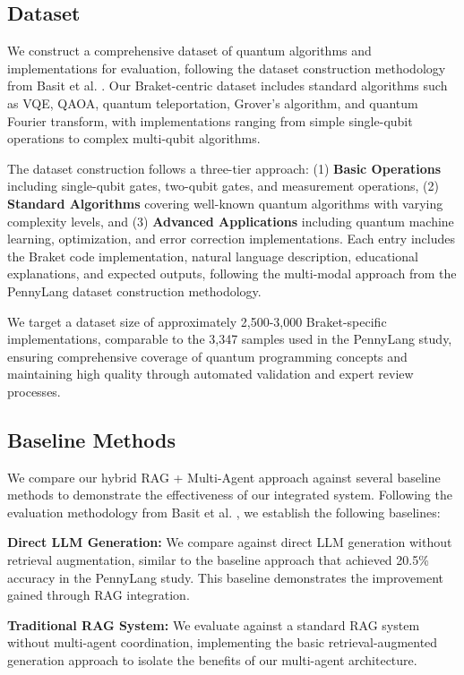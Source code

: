 \documentclass[runningheads]{llncs}
\begin{document}
\subsection{Dataset}
We construct a comprehensive dataset of quantum algorithms and implementations for evaluation, following the dataset construction methodology from Basit et al. \cite{basit2025pennylangpioneeringllmbasedquantum}. Our Braket-centric dataset includes standard algorithms such as VQE, QAOA, quantum teleportation, Grover's algorithm, and quantum Fourier transform, with implementations ranging from simple single-qubit operations to complex multi-qubit algorithms.

The dataset construction follows a three-tier approach: (1) \textbf{Basic Operations} including single-qubit gates, two-qubit gates, and measurement operations, (2) \textbf{Standard Algorithms} covering well-known quantum algorithms with varying complexity levels, and (3) \textbf{Advanced Applications} including quantum machine learning, optimization, and error correction implementations. Each entry includes the Braket code implementation, natural language description, educational explanations, and expected outputs, following the multi-modal approach from the PennyLang dataset construction methodology.

We target a dataset size of approximately 2,500-3,000 Braket-specific implementations, comparable to the 3,347 samples used in the PennyLang study, ensuring comprehensive coverage of quantum programming concepts and maintaining high quality through automated validation and expert review processes.

\subsection{Baseline Methods}
We compare our hybrid RAG + Multi-Agent approach against several baseline methods to demonstrate the effectiveness of our integrated system. Following the evaluation methodology from Basit et al. \cite{basit2025pennylangpioneeringllmbasedquantum}, we establish the following baselines:

\textbf{Direct LLM Generation:} We compare against direct LLM generation without retrieval augmentation, similar to the baseline approach that achieved 20.5\% accuracy in the PennyLang study. This baseline demonstrates the improvement gained through RAG integration.

\textbf{Traditional RAG System:} We evaluate against a standard RAG system without multi-agent coordination, implementing the basic retrieval-augmented generation approach to isolate the benefits of our multi-agent architecture.
\end{document}
